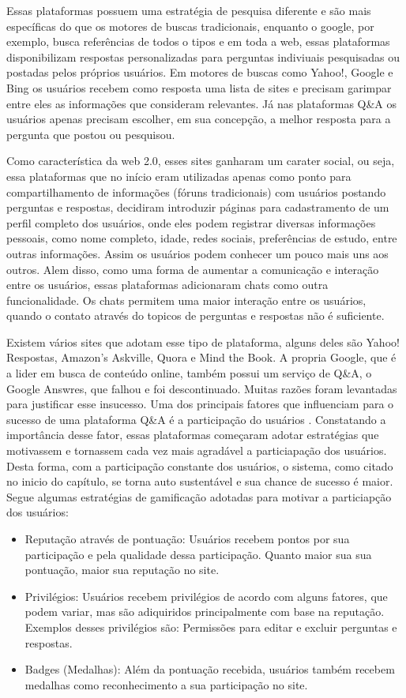  Essas plataformas possuem uma estratégia de pesquisa diferente e são mais específicas do que os motores de buscas tradicionais, enquanto o google, por exemplo, busca referências de todos o
 tipos e em toda a web, essas plataformas disponibilizam respostas personalizadas para perguntas indiviuais pesquisadas ou postadas pelos próprios usuários. Em motores de buscas como Yahoo!,
 Google e Bing os usuários recebem como resposta uma lista de sites e precisam garimpar entre eles as informações que consideram relevantes. Já nas plataformas Q\&A os usuários apenas precisam
 escolher, em sua concepção, a melhor resposta para a pergunta que postou ou pesquisou.

Como característica da web 2.0, esses sites ganharam um carater social, ou seja, essa plataformas que no início eram utilizadas apenas como ponto para compartilhamento de informações (fóruns tradicionais)
com usuários postando perguntas e respostas, decidiram  introduzir páginas para cadastramento de um perfil completo dos usuários, onde eles podem registrar diversas informações pessoais, como 
nome completo, idade, redes sociais, preferências de estudo, entre outras informações. Assim os usuários podem conhecer um pouco mais uns aos outros. Alem disso, como uma forma de aumentar a comunicação e interação
entre os usuários, essas plataformas adicionaram chats como outra funcionalidade. Os chats permitem uma maior interação entre os usuários, quando o contato através do topicos de perguntas e respostas não é suficiente.

Existem vários sites que adotam esse tipo de plataforma, alguns deles são Yahoo! Respostas, Amazon’s Askville, Quora e Mind the Book. A propria Google, que é a lider em busca de conteúdo online, também possui um serviço de Q\&A, 
o Google Answres, que falhou e foi descontinuado. Muitas razões foram levantadas para justificar esse insucesso. Uma dos principais fatores que influenciam para o sucesso de uma plataforma
 Q\&A é a participação do usuários \cite{shah2008explorin}. Constatando a importância desse fator, essas plataformas começaram adotar estratégias que motivassem e tornassem cada vez mais agradável a particiapação dos usuários. Desta forma, com a participação
 constante dos usuários, o sistema, como citado no inicio do capítulo, se torna auto sustentável e sua chance de sucesso é maior. Segue algumas estratégias de gamificação adotadas para  motivar a particiapção dos usuários:

\begin{itemize}
	\item Reputação através de pontuação: Usuários recebem pontos por sua participação e pela qualidade dessa participação. Quanto maior sua sua pontuação, maior sua reputação no site. 
	\item Privilégios: Usuários recebem privilégios de acordo com alguns fatores, que podem variar, mas são adiquiridos principalmente com base na reputação. Exemplos desses privilégios são: Permissões para editar e excluir perguntas e respostas.
	\item Badges (Medalhas): Além da pontuação recebida, usuários também recebem medalhas como reconhecimento a sua participação no site.  
\end{itemize}

